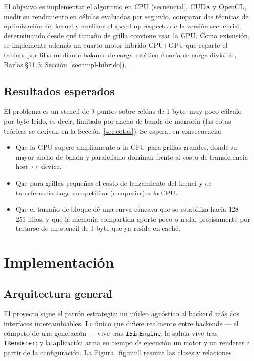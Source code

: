 \documentclass[
	spanish,
	letterpaper, oneside
]{article}
\begin{document}
El objetivo es implementar el algoritmo en CPU (secuencial), CUDA y OpenCL, medir
su rendimiento en células evaluadas por segundo, comparar dos técnicas de
optimización del kernel y analizar el speed-up respecto de la versión
secuencial, determinando desde qué tamaño de grilla conviene usar la GPU. Como
extensión, se implementa además un cuarto motor híbrido CPU+GPU que reparte
el tablero por filas mediante balance de carga estático (teoría de carga
divisible, Barlas \S11.3; Sección~\ref{sec:impl-hibrido}).

\subsection{Resultados esperados}
\label{sec:resultados-esperados}

El problema es un stencil de 9 puntos sobre celdas de 1 byte: muy poco
cálculo por byte leído, es decir, limitado por ancho de banda de memoria (las cotas
teóricas se derivan en la Sección~\ref{sec:cotas}). Se espera, en consecuencia:

\begin{itemize}
	\item Que la GPU supere ampliamente a la CPU para grillas grandes, donde su
	      mayor ancho de banda y paralelismo dominan frente al costo de
	      transferencia host\,$\leftrightarrow$\,device.
	\item Que para grillas pequeñas el costo de lanzamiento del kernel y de
	      transferencia haga competitiva (o superior) a la CPU.
	\item Que el tamaño de bloque dé una curva cóncava que se estabiliza hacia
	      $128$--$256$ hilos, y que la memoria compartida aporte poco o nada,
	      precisamente por tratarse de un stencil de 1 byte que ya reside
	      en caché.
\end{itemize}

\section{Implementación}
\label{sec:implementacion}

\subsection{Arquitectura general}
\label{sec:arquitectura}

El proyecto sigue el patrón estrategia: un núcleo agnóstico al backend más
dos interfaces intercambiables. Lo único que difiere realmente entre backends ---
el cómputo de una generación --- vive tras \texttt{ISimEngine}; la salida vive
tras \texttt{IRenderer}; y la aplicación arma en tiempo de ejecución un motor y un
renderer a partir de la configuración. La Figura~\ref{fig:uml} resume las
clases y relaciones.
\end{document}
